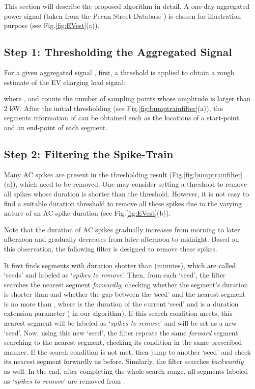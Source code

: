 \documentclass[conference]{IEEEtran}
\begin{document}
This section will describe the proposed algorithm  in detail. A one-day aggregated power signal (taken from the Pecan Street Database \cite{PecanStreetDatabase}) is chosen for illustration purpose (see Fig.\ref{fig:EVest}(a)).



\subsection{Step 1: Thresholding the Aggregated Signal}

For a given aggregated signal , first, a threshold   is applied to obtain a rough estimate of the EV charging load signal:

where ,
and  counts the number of sampling points whose amplitude is larger than 2 kW. After the initial thresholding (see Fig.\ref{fig:bumptrainfilter}(a)), the segments information of  can be obtained such as the locations of a start-point and an end-point of each segment.




\subsection{Step 2: Filtering the Spike-Train}

Many AC spikes are present in the thresholding result (Fig.\ref{fig:bumptrainfilter}(a)), which need to be removed. One may consider setting a threshold to remove all spikes whose duration is shorter than the threshold. However, it is not easy to find a suitable duration threshold to remove all these spikes due to the varying nature of an AC spike duration (see Fig.\ref{fig:EVest}(b)).

Note that the duration of AC spikes gradually increases from morning to later afternoon and gradually decreases from later afternoon to midnight. Based on this observation, the following filter is designed to remove these spikes.


It first finds segments with duration shorter than  (minutes), which are called `seeds' and labeled as `\emph{spikes to remove}'. Then, from each `seed', the filter searches the nearest segment \emph{forwardly}, checking whether the segment's duration is shorter than  and whether the gap between the `seed' and the nearest segment is no more than , where  is the duration of the current `seed' and  is a duration extension parameter ( in our algorithm).  If this search condition meets, this nearest segment will be labeled as `\emph{spikes to remove}' and will be set as a new `seed'. Now, using this new `seed', the filter repeats the same \emph{forward} segment searching to the nearest segment, checking its condition in the same prescribed manner. If the search condition is not met, then jump to another `seed' and check its nearest segment forwardly as before. Similarly, the filter searches \emph{backwardly} as well. In the end, after completing the whole search range, all segments labeled as `\emph{spikes to remove}' are removed from .
\end{document}
